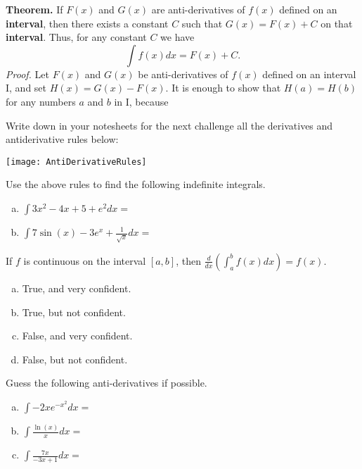 \documentclass[answers]{exam}
\begin{document}
\begin{questions}
\question \textbf{Theorem.} If $F(x)$ and $G(x)$ are anti-derivatives of $f(x)$ defined on an \textbf{interval}, then there exists a constant $C$ such that $G(x) = F(x) + C$ on that \textbf{interval}. Thus, for any constant $C$ we have
\[ \int f(x) dx = F(x) + C. \]
\emph{Proof.} Let $F(x)$ and $G(x)$ be anti-derivatives of $f(x)$ defined on an interval I, and set $H(x) = G(x)-F(x)$. It is enough to show that $H(a) = H(b)$ for any numbers $a$ and $b$ in I, because

\hfill \break
\hfill \break
\hfill \break
\hfill \break
\hfill \break
\hfill \break

\question Write down in your notesheets for the next challenge all the derivatives and antiderivative rules below:


\texttt{[image: AntiDerivativeRules]}


 Use the above rules to find the following indefinite integrals.
\begin{enumerate}[(a)]
\item $\displaystyle \int 3x^2 - 4x + 5 + e^{2}dx  =$



\item $\displaystyle \int 7\sin(x) -3e^x + \frac{1}{\sqrt{x}}dx = $


\end{enumerate}

\question If $f$ is continuous on the interval $[a, b]$, then $\frac{d}{dx}\left(\int_a^b f(x) dx\right) = f(x)$.
\begin{enumerate}[(a)]
	\item True, and very confident.
	\item True, but not confident.
	\item False, and very confident.
	\item False, but not confident.
\end{enumerate}

\question Guess the following anti-derivatives if possible.
\begin{enumerate}[(a)]

\item $\displaystyle \int -2xe^{-x^2} dx = $


\item $\displaystyle  \int \frac{\ln(x)}{x} dx =$


\item $\displaystyle  \int \frac{7x}{-3x+1} dx =$



\end{enumerate}


\end{questions}
\end{document}

